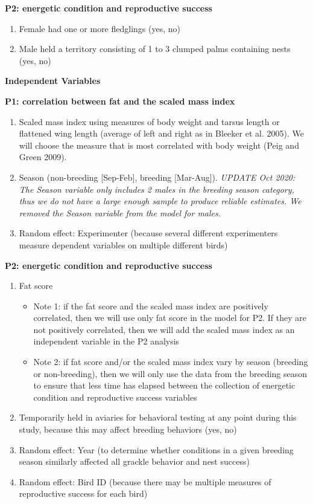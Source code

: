 \documentclass[
]{article}
\providecommand{\tightlist}{%
  \setlength{\itemsep}{0pt}\setlength{\parskip}{0pt}}
\begin{document}
\textbf{P2: energetic condition and reproductive success}

\begin{enumerate}
\def\labelenumi{\arabic{enumi})}
\item
  Female had one or more fledglings (yes, no)
\item
  Male held a territory consisting of 1 to 3 clumped palms containing
  nests (yes, no)
\end{enumerate}

\textbf{Independent Variables}

\textbf{P1: correlation between fat and the scaled mass index}

\begin{enumerate}
\def\labelenumi{\arabic{enumi})}
\item
  Scaled mass index using measures of body weight and tarsus length or
  flattened wing length (average of left and right as in Bleeker et al.
  2005). We will choose the measure that is most correlated with body
  weight (Peig and Green 2009).
\item
  Season (non-breeding {[}Sep-Feb{]}, breeding {[}Mar-Aug{]}).
  \emph{UPDATE Oct 2020: The Season variable only includes 2 males in
  the breeding season category, thus we do not have a large enough
  sample to produce reliable estimates. We removed the Season variable
  from the model for males.}
\item
  Random effect: Experimenter (because several different experimenters
  measure dependent variables on multiple different birds)
\end{enumerate}

\textbf{P2: energetic condition and reproductive success}

\begin{enumerate}
\def\labelenumi{\arabic{enumi})}
\item
  Fat score

  \begin{itemize}
  \tightlist
  \item
    Note 1: if the fat score and the scaled mass index are positively
    correlated, then we will use only fat score in the model for P2. If
    they are not positively correlated, then we will add the scaled mass
    index as an independent variable in the P2 analysis
  \item
    Note 2: if fat score and/or the scaled mass index vary by season
    (breeding or non-breeding), then we will only use the data from the
    breeding season to ensure that less time has elapsed between the
    collection of energetic condition and reproductive success variables
  \end{itemize}
\item
  Temporarily held in aviaries for behavioral testing at any point
  during this study, because this may affect breeding behaviors (yes,
  no)
\item
  Random effect: Year (to determine whether conditions in a given
  breeding season similarly affected all grackle behavior and nest
  success)
\item
  Random effect: Bird ID (because there may be multiple measures of
  reproductive success for each bird)
\end{enumerate}
\end{document}
